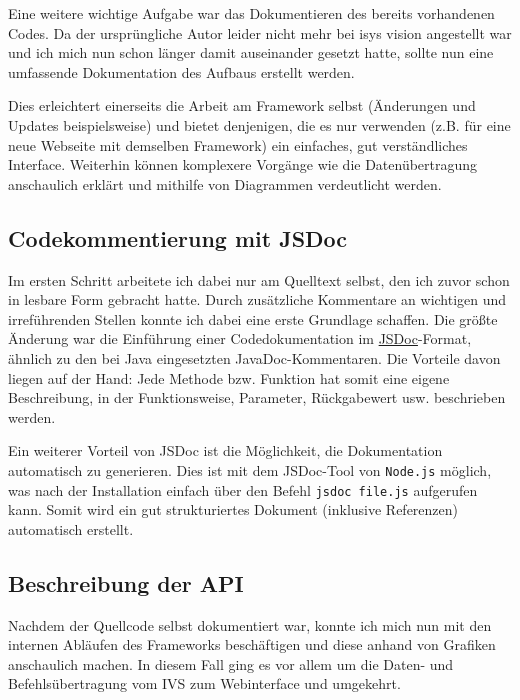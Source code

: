\documentclass[xcolor=dvipsnames,11pt,paper=a4paper]{report}
\begin{document}
Eine weitere wichtige Aufgabe war das Dokumentieren des bereits vorhandenen Codes.
Da der ursprüngliche Autor leider nicht mehr bei isys vision angestellt war und
ich mich nun schon länger damit auseinander gesetzt hatte, sollte nun eine umfassende
Dokumentation des Aufbaus erstellt werden.

Dies erleichtert einerseits die Arbeit am Framework selbst (Änderungen und Updates
beispielsweise) und bietet denjenigen, die es nur verwenden (z.B. für eine neue
Webseite mit demselben Framework) ein einfaches, gut verständliches Interface. Weiterhin
können komplexere Vorgänge wie die Datenübertragung anschaulich erklärt und mithilfe
von Diagrammen verdeutlicht werden.


\subsection{Codekommentierung mit JSDoc}
\label{subsec:ivs-dokumentation-jsdoc}

Im ersten Schritt arbeitete ich dabei nur am Quelltext selbst, den ich zuvor schon
in lesbare Form gebracht hatte. Durch zusätzliche Kommentare an wichtigen und irreführenden
Stellen konnte ich dabei eine erste Grundlage schaffen. Die größte Änderung war
die Einführung einer Codedokumentation im \href{https://en.wikipedia.org/wiki/JSDoc}{JSDoc}-Format,
ähnlich zu den bei Java eingesetzten JavaDoc-Kommentaren. Die Vorteile davon liegen
auf der Hand: Jede Methode bzw. Funktion hat somit eine eigene Beschreibung, in
der Funktionsweise, Parameter, Rückgabewert usw. beschrieben werden.

Ein weiterer Vorteil von JSDoc ist die Möglichkeit, die Dokumentation automatisch
zu generieren. Dies ist mit dem JSDoc-Tool von \texttt{Node.js} möglich, was nach
der Installation einfach über den Befehl \texttt{jsdoc file.js} aufgerufen kann.
Somit wird ein gut strukturiertes Dokument (inklusive Referenzen) automatisch erstellt.


\subsection{Beschreibung der API}
\label{subsec:ivs-dokumentation-beschreibung}

Nachdem der Quellcode selbst dokumentiert war, konnte ich mich nun mit den internen
Abläufen des Frameworks beschäftigen und diese anhand von Grafiken anschaulich machen.
In diesem Fall ging es vor allem um die Daten- und Befehlsübertragung vom IVS zum
Webinterface und umgekehrt.
\end{document}
